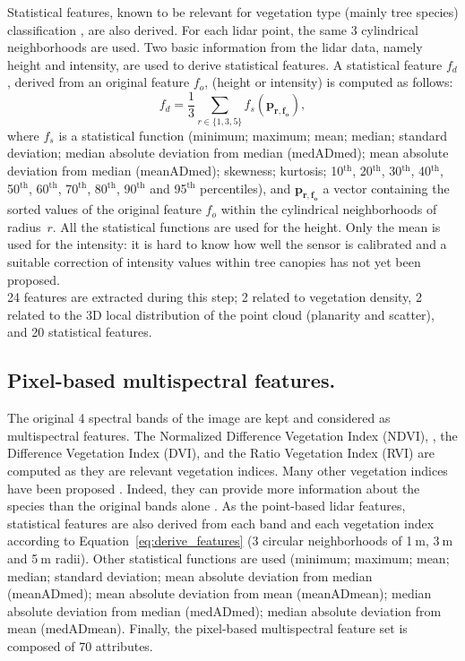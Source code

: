 Statistical features, known to be relevant for vegetation type (mainly tree species) classification \citep{dalponte2014tree,torabzadeh2015optimal}, are also derived. For each lidar point, the same 3 cylindrical neighborhoods are used. Two basic information from the lidar data, namely height and intensity, are used to derive statistical features. A statistical feature $f_{d}$, derived from an original feature $f_{o}$, (height or intensity) is computed as follows: \\
\begin{equation}
f_{d} = \frac{1}{3}\sum_{r \in \{1,3,5\}}f_{s}(\mathbf{p_{r,f_{o}}}), 
\label{eq:derive_features}
\end{equation}
where $f_{s}$ is a statistical function (minimum; maximum; mean; median; standard deviation; median absolute deviation from median (medADmed); mean absolute deviation from median (meanADmed); skewness; kurtosis; 10$^{\text{th}}$, 20$^{\text{th}}$, 30$^{\text{th}}$, 40$^{\text{th}}$, 50$^{\text{th}}$, 60$^{\text{th}}$, 70$^{\text{th}}$, 80$^{\text{th}}$, 90$^{\text{th}}$ and 95$^{\text{th}}$ percentiles), and $\mathbf{p_{r,f_{o}}}$ a vector containing the sorted values of the original feature $f_{o}$ within the cylindrical neighborhoods of radius~$r$. All the statistical functions are used for the height. Only the mean is used for the intensity: it is hard to know how well the sensor is calibrated and a suitable correction of intensity values within tree canopies has not yet been proposed. \\
24 features are extracted during this step; 2 related to vegetation density, 2 related to the 3D local distribution of the point cloud (planarity and scatter), and 20 statistical features.

\subsection{Pixel-based multispectral features.}
The original 4 spectral bands of the image are kept and considered as multispectral features. The Normalized Difference Vegetation Index (NDVI), \citep{tucker1979red},
the Difference Vegetation Index (DVI), \citep{bacour2006normalization}
and the Ratio Vegetation Index (RVI) \citep{jordan1969derivation}
are computed as they are relevant vegetation indices. Many other vegetation indices have been proposed \citep{bannari1995review}. Indeed, they can provide more information about the species than the original bands alone \citep{zargar2011review}. As the point-based lidar features, statistical features are also derived from each band and each vegetation index according to Equation~\ref{eq:derive_features} (3 circular neighborhoods of 1$\:$m, 3$\:$m and 5$\:$m radii). Other statistical functions are used (minimum; maximum; mean; median; standard deviation; mean absolute deviation from median (meanADmed); mean absolute deviation from mean (meanADmean); median absolute deviation from median (medADmed); median absolute deviation from mean (medADmean). Finally, the pixel-based multispectral feature set is composed of 70 attributes.

